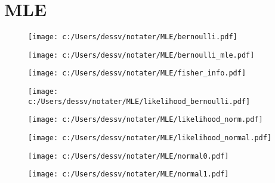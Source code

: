 \chapter{MLE} 
\begin{figure} 
\texttt{[image: c:/Users/dessv/notater/MLE/bernoulli.pdf]} 
\end{figure} 
\begin{figure} 
\texttt{[image: c:/Users/dessv/notater/MLE/bernoulli\_mle.pdf]} 
\end{figure} 
\begin{figure} 
\texttt{[image: c:/Users/dessv/notater/MLE/fisher\_info.pdf]} 
\end{figure} 
\begin{figure} 
\texttt{[image: c:/Users/dessv/notater/MLE/likelihood\_bernoulli.pdf]} 
\end{figure} 
\begin{figure} 
\texttt{[image: c:/Users/dessv/notater/MLE/likelihood\_norm.pdf]} 
\end{figure} 
\begin{figure} 
\texttt{[image: c:/Users/dessv/notater/MLE/likelihood\_normal.pdf]} 
\end{figure} 
\begin{figure} 
\texttt{[image: c:/Users/dessv/notater/MLE/normal0.pdf]} 
\end{figure} 
\begin{figure} 
\texttt{[image: c:/Users/dessv/notater/MLE/normal1.pdf]} 
\end{figure} 
